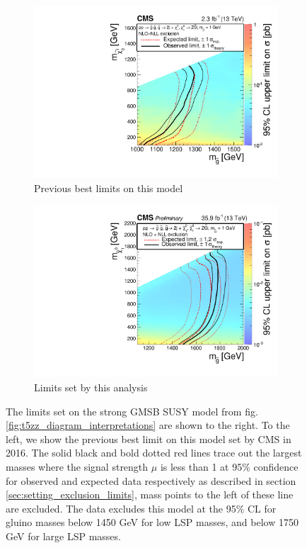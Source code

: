     \begin{figure}[!h]
      \centering
        \begin{subfigure}[b]{0.4\textwidth}
          \label{fig:t5zz_interpretations_2015}
          \includegraphics[width=\textwidth]{figures/interpretations/t5zz_2015_exclusion.pdf}
          \caption{Previous best limits on this model}
        \end{subfigure}
        \begin{subfigure}[b]{0.4\textwidth}
          \label{fig:t5zz_interpretations_current}
          \includegraphics[width=\textwidth]{figures/interpretations/T5ZZ_Exclusion_13TeV.pdf}
          \caption{Limits set by this analysis}
        \end{subfigure}
      \caption{ \label{fig:t5zz_interpretation}
        The limits set on the strong GMSB SUSY model from fig. \ref{fig:t5zz_diagram_interpretations} are shown to the right. To the left, we show the previous best limit on this model set by CMS in 2016.\cite{paper_2015} The solid black and bold dotted red lines trace out the largest masses where the signal strength $\mu$ is less than 1 at 95\% confidence for observed and expected data respectively as described in section \ref{sec:setting_exclusion_limits}, mass points to the left of these line are excluded. The data excludes this model at the 95\% CL for gluino masses below 1450 GeV for low LSP masses, and below 1750 GeV for large LSP masses.
      }
    \end{figure}

